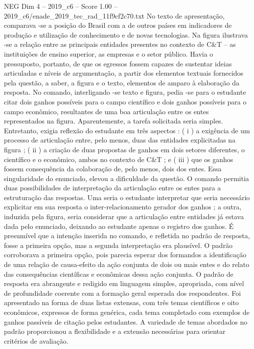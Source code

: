 \begin{textsample}{NEG Dim 4 – 2019\_c6 – Score 1.00 – 2019\_c6/enade\_2019\_tec\_rad\_11f9cf2c70.txt}
No texto de apresentação, comparava -se a posição do Brasil com a de outros países em indicadores de produção e utilização de conhecimento e de novas tecnologias.
Na figura ilustrava -se a relação entre as principais entidades presentes no contexto de C\&T – as instituições de ensino superior, as empresas e o setor público.
Havia o pressuposto, portanto, de que os egressos fossem capazes de sustentar ideias articuladas e níveis de argumentação, a partir dos elementos textuais fornecidos pela questão, a saber, a figura e o texto, elementos de amparo à elaboração da resposta.
No comando, interligando -se texto e figura, pedia -se para o estudante citar dois ganhos possíveis para o campo científico e dois ganhos possíveis para o campo econômico, resultantes de uma boa articulação entre os entes representados na figura.
Aparentemente, a tarefa solicitada seria simples.
Entretanto, exigia reflexão do estudante em três aspectos : ( i ) a exigência de um processo de articulação entre, pelo menos, duas das entidades explicitadas na figura ; ( ii ) a criação de duas propostas de ganhos em dois setores diferentes, o científico e o econômico, ambos no contexto de C\&T ; e ( iii ) que os ganhos fossem consequência da colaboração de, pelo menos, dois dos entes.
Essa singularidade do enunciado, elevou a dificuldade da questão.
O comando permitia duas possibilidades de interpretação da articulação entre os entes para a estruturação das respostas.
Uma seria o estudante interpretar que seria necessário explicitar em sua resposta o inter-relacionamento gerador dos ganhos ; a outra, induzida pela figura, seria considerar que a articulação entre entidades já estava dada pelo enunciado, deixando ao estudante apenas o registro dos ganhos.
É presumível que a intenção inserida no comando, e refletida no padrão de resposta, fosse a primeira opção, mas a segunda interpretação era plausível.
O padrão corroborava a primeira opção, pois parecia esperar dos formandos a identificação de uma relação de causa-efeito da ação conjunta de dois ou mais entes e do relato das consequências científicas e econômicas dessa ação conjunta.
O padrão de resposta era abrangente e redigido em linguagem simples, apropriada, com nível de profundidade coerente com a formação geral esperada dos respondentes.
Foi apresentado na forma de duas listas extensas, com três temas científicos e oito econômicos, expressos de forma genérica, cada tema completado com exemplos de ganhos passíveis de citação pelos estudantes.
A variedade de temas abordados no padrão proporcionou a flexibilidade e a extensão necessárias para orientar critérios de avaliação.

\end{textsample}
